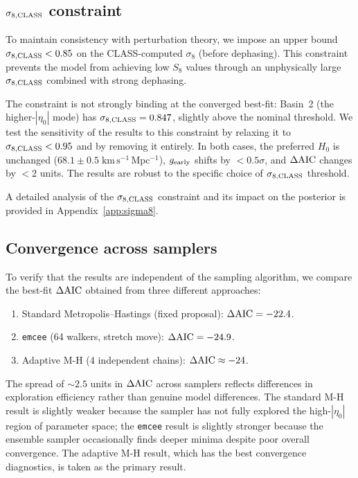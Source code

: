 \documentclass[aps,prd,twocolumn,superscriptaddress,nofootinbib]{revtex4-2}
\newcommand{\Hubble}{H_0}
\newcommand{\dAIC}{\Delta{\rm AIC}}
\newcommand{\gearly}{g_{\rm early}}
\newcommand{\etaz}{\eta_0}
\begin{document}
\subsection{$\sigma_{8,\rm CLASS}$ constraint}
\label{sec:sigma8_constraint}

To maintain consistency with perturbation theory, we impose an upper
bound $\sigma_{8,\rm CLASS} < 0.85$ on the CLASS-computed $\sigma_8$
(before dephasing). This constraint prevents the model from achieving
low $S_8$ values through an unphysically large $\sigma_{8,\rm CLASS}$
combined with strong dephasing.

The constraint is not strongly binding at the converged best-fit:
Basin~2 (the higher-$|\etaz|$ mode) has $\sigma_{8,\rm CLASS} = 0.847$,
slightly above the nominal threshold. We test the sensitivity of the
results to this constraint by relaxing it to $\sigma_{8,\rm CLASS} <
0.95$ and by removing it entirely. In both cases, the preferred
$\Hubble$ is unchanged ($68.1 \pm 0.5\;\mathrm{km\,s^{-1}\,Mpc^{-1}}$),
$\gearly$ shifts by $< 0.5\sigma$, and $\dAIC$ changes by $< 2$
units. The results are robust to the specific choice of
$\sigma_{8,\rm CLASS}$ threshold.

A detailed analysis of the $\sigma_{8,\rm CLASS}$ constraint and its
impact on the posterior is provided in Appendix~\ref{app:sigma8}.

\subsection{Convergence across samplers}
\label{sec:sampler_convergence}

To verify that the results are independent of the sampling algorithm,
we compare the best-fit $\dAIC$ obtained from three different
approaches:
\begin{enumerate}
\item Standard Metropolis--Hastings (fixed proposal): $\dAIC = -22.4$.
\item \texttt{emcee} (64 walkers, stretch move): $\dAIC = -24.9$.
\item Adaptive M-H (4 independent chains): $\dAIC \approx -24$.
\end{enumerate}
The spread of $\sim 2.5$ units in $\dAIC$ across samplers reflects
differences in exploration efficiency rather than genuine model
differences. The standard M-H result is slightly weaker because the
sampler has not fully explored the high-$|\etaz|$ region of parameter
space; the \texttt{emcee} result is slightly stronger because the
ensemble sampler occasionally finds deeper minima despite poor
overall convergence. The adaptive M-H result, which has the best
convergence diagnostics, is taken as the primary result.
\end{document}
